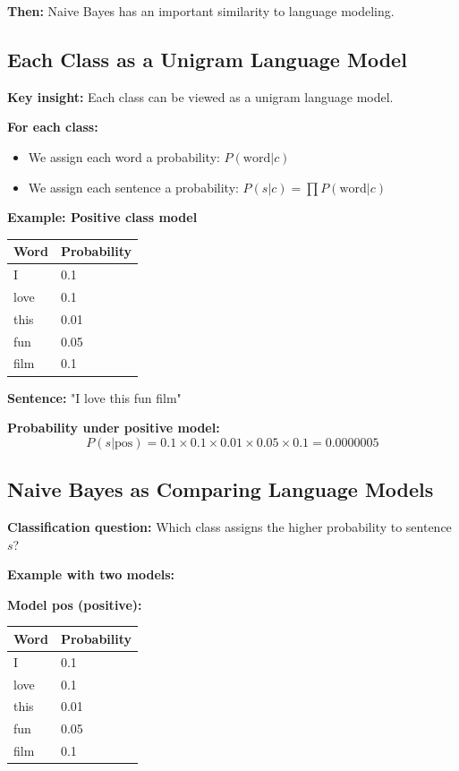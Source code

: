 \documentclass[11pt,a4paper]{article}
\theoremstyle{definition}
\theoremstyle{plain}
\theoremstyle{remark}
\begin{document}
\textbf{Then:} Naive Bayes has an important similarity to language modeling.

\subsection{Each Class as a Unigram Language Model}

\textbf{Key insight:} Each class can be viewed as a unigram language model.

\textbf{For each class:}
\begin{itemize}
    \item We assign each word a probability: $P(\text{word} | c)$
    \item We assign each sentence a probability: $P(s | c) = \prod P(\text{word} | c)$
\end{itemize}

\textbf{Example: Positive class model}

\begin{center}
\begin{tabular}{ll}
\textbf{Word} & \textbf{Probability} \\
\hline
I & 0.1 \\
love & 0.1 \\
this & 0.01 \\
fun & 0.05 \\
film & 0.1 \\
\end{tabular}
\end{center}

\textbf{Sentence:} "I love this fun film"

\textbf{Probability under positive model:}
\[
P(s | \text{pos}) = 0.1 \times 0.1 \times 0.01 \times 0.05 \times 0.1 = 0.0000005
\]

\subsection{Naive Bayes as Comparing Language Models}

\textbf{Classification question:} Which class assigns the higher probability to sentence $s$?

\textbf{Example with two models:}

\textbf{Model pos (positive):}
\begin{center}
\begin{tabular}{ll}
Word & Probability \\
\hline
I & 0.1 \\
love & 0.1 \\
this & 0.01 \\
fun & 0.05 \\
film & 0.1 \\
\end{tabular}
\end{center}
\end{document}
